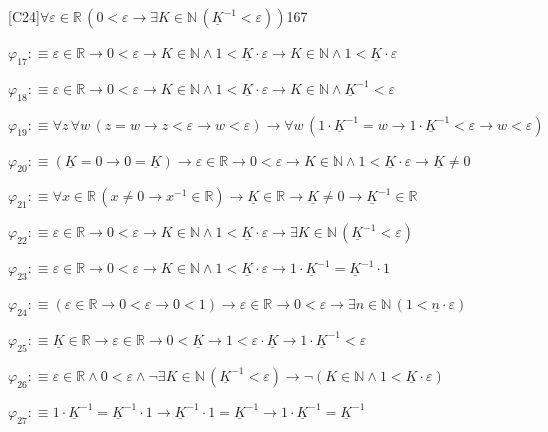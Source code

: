 \begin{fullproof}{[C24]}{$\forall \varepsilon \in \mathbb{R}\,(0 < \varepsilon \to \exists K \in \mathbb{N}\,(\underline{K}^{-1} < \varepsilon))$}{167}
\begin{abbrevlist}
\item $\varphi_{17} :\equiv \varepsilon \in \mathbb{R} \to 0 < \varepsilon \to K \in \mathbb{N} \land 1 < \underline{K} \cdot \varepsilon \to K \in \mathbb{N} \land 1 < \underline{K} \cdot \varepsilon$
\item $\varphi_{18} :\equiv \varepsilon \in \mathbb{R} \to 0 < \varepsilon \to K \in \mathbb{N} \land 1 < \underline{K} \cdot \varepsilon \to K \in \mathbb{N} \land \underline{K}^{-1} < \varepsilon$
\item $\varphi_{19} :\equiv \forall z\,\forall w\,(z = w \to z < \varepsilon \to w < \varepsilon) \to \forall w\,(1 \cdot \underline{K}^{-1} = w \to 1 \cdot \underline{K}^{-1} < \varepsilon \to w < \varepsilon)$
\item $\varphi_{20} :\equiv (\underline{K} = 0 \to 0 = \underline{K}) \to \varepsilon \in \mathbb{R} \to 0 < \varepsilon \to K \in \mathbb{N} \land 1 < \underline{K} \cdot \varepsilon \to \underline{K} \neq 0$
\item $\varphi_{21} :\equiv \forall x \in \mathbb{R}\,(x \neq 0 \to x^{-1} \in \mathbb{R}) \to \underline{K} \in \mathbb{R} \to \underline{K} \neq 0 \to \underline{K}^{-1} \in \mathbb{R}$
\item $\varphi_{22} :\equiv \varepsilon \in \mathbb{R} \to 0 < \varepsilon \to K \in \mathbb{N} \land 1 < \underline{K} \cdot \varepsilon \to \exists K \in \mathbb{N}\,(\underline{K}^{-1} < \varepsilon)$
\item $\varphi_{23} :\equiv \varepsilon \in \mathbb{R} \to 0 < \varepsilon \to K \in \mathbb{N} \land 1 < \underline{K} \cdot \varepsilon \to 1 \cdot \underline{K}^{-1} = \underline{K}^{-1} \cdot 1$
\item $\varphi_{24} :\equiv (\varepsilon \in \mathbb{R} \to 0 < \varepsilon \to 0 < 1) \to \varepsilon \in \mathbb{R} \to 0 < \varepsilon \to \exists n \in \mathbb{N}\,(1 < \underline{n} \cdot \varepsilon)$
\item $\varphi_{25} :\equiv \underline{K} \in \mathbb{R} \to \varepsilon \in \mathbb{R} \to 0 < \underline{K} \to 1 < \varepsilon \cdot \underline{K} \to 1 \cdot \underline{K}^{-1} < \varepsilon$
\item $\varphi_{26} :\equiv \varepsilon \in \mathbb{R} \land 0 < \varepsilon \land \neg \exists K \in \mathbb{N}\,(\underline{K}^{-1} < \varepsilon) \to \neg (K \in \mathbb{N} \land 1 < \underline{K} \cdot \varepsilon)$
\item $\varphi_{27} :\equiv 1 \cdot \underline{K}^{-1} = \underline{K}^{-1} \cdot 1 \to \underline{K}^{-1} \cdot 1 = \underline{K}^{-1} \to 1 \cdot \underline{K}^{-1} = \underline{K}^{-1}$

\end{abbrevlist}
\end{fullproof}
